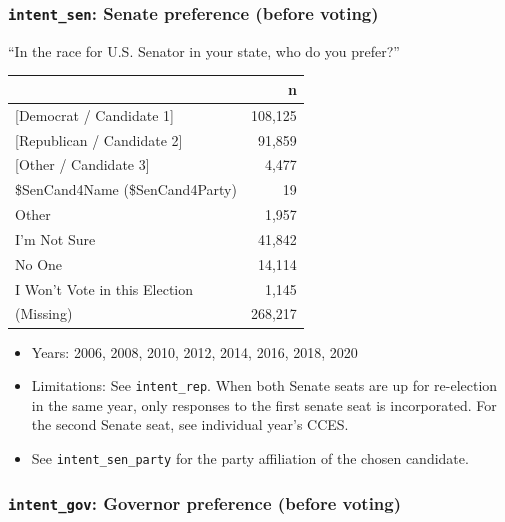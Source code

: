 \documentclass[10pt,article,oneside]{memoir}
\theoremstyle{definition}
\begin{document}
\hypertarget{intent_sen-senate-preference-before-voting}{%
\subsubsection{\texorpdfstring{\texttt{intent\_sen}: Senate preference
(before
voting)}{intent\_sen: Senate preference (before voting)}}\label{intent_sen-senate-preference-before-voting}}

``In the race for U.S. Senator in your state, who do you prefer?''

\begin{table}[H]
\centering
\begin{tabular}[t]{lr}
\toprule
 & n\\
\midrule
{}{[Democrat / Candidate 1]} & 108,125\\
{}{[Republican / Candidate 2]} & 91,859\\
{}{[Other / Candidate 3]} & 4,477\\
\$SenCand4Name (\$SenCand4Party) & 19\\
Other & 1,957\\
I'm Not Sure & 41,842\\
No One & 14,114\\
I Won't Vote in this Election & 1,145\\
(Missing) & 268,217\\
\bottomrule
\end{tabular}
\end{table}

\begin{itemize}
\tightlist
\item
  Years: 2006, 2008, 2010, 2012, 2014, 2016, 2018, 2020
\item
  Limitations: See \texttt{intent\_rep}. When both Senate seats are up
  for re-election in the same year, only responses to the first senate
  seat is incorporated. For the second Senate seat, see individual
  year's CCES.
\item
  See \texttt{intent\_sen\_party} for the party affiliation of the
  chosen candidate.
\end{itemize}

\hypertarget{intent_gov-governor-preference-before-voting}{%
\subsubsection{\texorpdfstring{\texttt{intent\_gov}: Governor preference
(before
voting)}{intent\_gov: Governor preference (before voting)}}\label{intent_gov-governor-preference-before-voting}}
\end{document}
